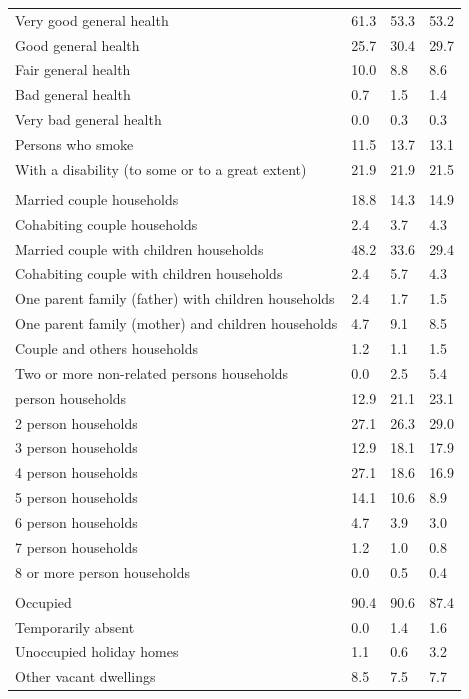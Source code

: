 \documentclass{article}
\begin{document}
\begin{table}[h]
\begin{tabular}{KTTT}
Very good general health & 61.3& 53.3& 53.2\\
Good general health & 25.7& 30.4& 29.7\\
Fair general health & 10.0&  8.8&  8.6\\
Bad general health & 0.7& 1.5& 1.4\\
Very bad general health & 0.0& 0.3& 0.3\\
    \hline
Persons who smoke & 11.5& 13.7& 13.1\\
    \hline
With a disability (to some or to a great extent) & 21.9& 21.9& 21.5\\
\hline
    \\ 
    \hline
Married couple households & 18.8& 14.3& 14.9\\
Cohabiting couple households & 2.4& 3.7& 4.3\\
Married couple with children households & 48.2& 33.6& 29.4\\
Cohabiting couple with children households & 2.4& 5.7& 4.3\\
One parent family (father) with  children households & 2.4& 1.7& 1.5\\
One parent family (mother) and children households & 4.7& 9.1& 8.5\\
Couple and others households  & 1.2& 1.1& 1.5\\
Two or more non-related persons households & 0.0& 2.5& 5.4\\
     person households & 12.9& 21.1& 23.1\\
2 person households & 27.1& 26.3& 29.0\\
3 person households & 12.9& 18.1& 17.9\\
4 person households & 27.1& 18.6& 16.9\\
5 person households & 14.1& 10.6&  8.9\\
6 person households & 4.7& 3.9& 3.0\\
7 person households & 1.2& 1.0& 0.8\\
8 or more person households & 0.0& 0.5& 0.4\\
\hline
    \\ 
    \hline
Occupied & 90.4& 90.6& 87.4\\
Temporarily absent & 0.0& 1.4& 1.6\\
Unoccupied holiday homes & 1.1& 0.6& 3.2\\
Other vacant dwellings & 8.5& 7.5& 7.7\\
\hline
\end{tabular}
\end{table}
\end{document}
